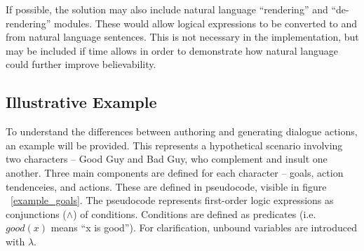\documentclass{article}
\begin{document}
If possible, the solution may also include natural language
``rendering'' and ``de-rendering'' modules.  These would allow logical
expressions to be converted to and from natural language sentences.
This is not necessary in the implementation, but may be included if
time allows in order to demonstrate how natural language could further
improve believability.

\subsection{Illustrative Example}

To understand the differences between authoring and generating
dialogue actions, an example will be provided.  This represents a
hypothetical scenario involving two characters -- Good Guy and Bad
Guy, who complement and insult one another.  Three main components are
defined for each character -- goals, action tendenceies, and
actions.  These are defined in pseudocode, visible in figure
~\ref{example_goals}.  The pseudocode represents first-order logic
expressions as conjunctions ($\wedge$) of conditions.  Conditions
are defined as predicates (i.e. $good(x)$ means ``x is good'').
For clarification, unbound variables are introduced with $\lambda$.
\end{document}

